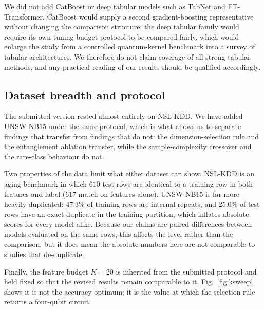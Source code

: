 We did not add CatBoost or deep tabular models such as TabNet and
FT-Transformer. CatBoost would supply a second gradient-boosting representative
without changing the comparison structure; the deep tabular family would require
its own tuning-budget protocol to be compared fairly, which would enlarge the
study from a controlled quantum-kernel benchmark into a survey of tabular
architectures. We therefore do not claim coverage of all strong tabular methods,
and any practical reading of our results should be qualified accordingly.

\subsection{Dataset breadth and protocol}

The submitted version rested almost entirely on NSL-KDD. We have added
UNSW-NB15 under the same protocol, which is what allows us to separate findings
that transfer from findings that do not: the dimension-selection rule and the
entanglement ablation transfer, while the sample-complexity crossover and the
rare-class behaviour do not.

Two properties of the data limit what either dataset can show. NSL-KDD is an
aging benchmark in which $610$ test rows are identical to a training row in both
features and label ($617$ match on features alone). UNSW-NB15 is far more heavily
duplicated: $47.3\%$ of training rows are internal repeats, and $25.0\%$ of test
rows have an exact duplicate in the training partition, which
inflates absolute scores for every model alike. Because our claims are paired
differences between models evaluated on the same rows, this affects the level
rather than the comparison, but it does mean the absolute numbers here are not
comparable to studies that de-duplicate.

Finally, the feature budget $K=20$ is inherited from the submitted protocol and
held fixed so that the revised results remain comparable to it.
Fig.~\ref{fig:ksweep} shows it is not the accuracy optimum; it is the value at
which the selection rule returns a four-qubit circuit.
